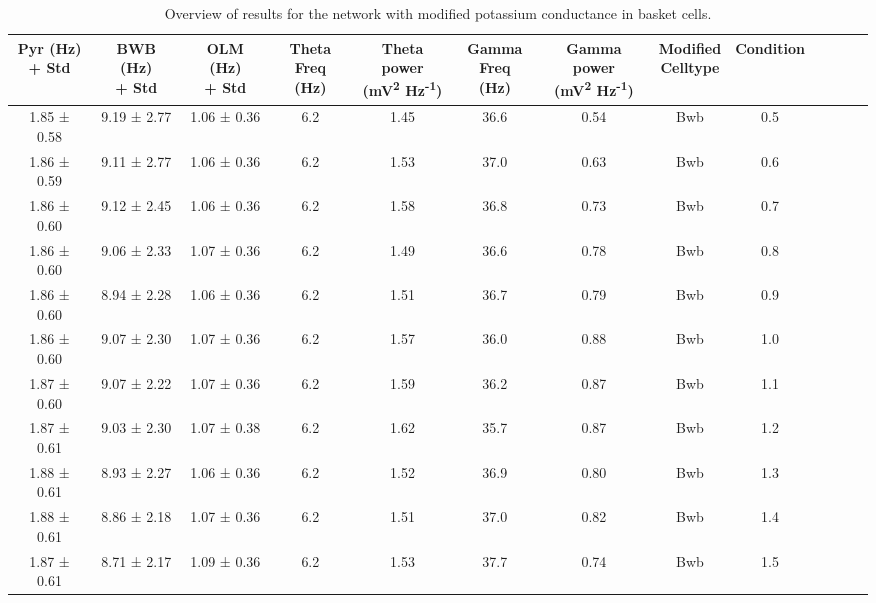 \begin{table}[htbp]
    \caption[Potassium variant: Basket cell]{Overview of results for the network with modified potassium conductance in basket cells.}\label{table:K_variant_bwb}
    \begin{adjustbox}{width=\textwidth}
        \begin{tabular}{ccccccccccccc}
            \hline
            \CellWithForcedBreak{Pyr (Hz)                                                  \\ + Std} & \CellWithForcedBreak{BWB (Hz) \\ + Std} & \CellWithForcedBreak{OLM (Hz) \\ + Std} & \CellWithForcedBreak{Theta \\ Freq (Hz)} & \CellWithForcedBreak{Theta power \\ (mV\textsuperscript{2} Hz\textsuperscript{-1})} & \CellWithForcedBreak{Gamma \\ Freq (Hz)} & \CellWithForcedBreak{Gamma power \\ (mV\textsuperscript{2} Hz\textsuperscript{-1})} & \CellWithForcedBreak{Modified \\ Celltype} & Condition \\
            \hline
            1.85 ± 0.58 & 9.19 ± 2.77 & 1.06 ± 0.36 & 6.2 & 1.45 & 36.6 & 0.54 & Bwb & 0.5 \\
            1.86 ± 0.59 & 9.11 ± 2.77 & 1.06 ± 0.36 & 6.2 & 1.53 & 37.0 & 0.63 & Bwb & 0.6 \\
            1.86 ± 0.60 & 9.12 ± 2.45 & 1.06 ± 0.36 & 6.2 & 1.58 & 36.8 & 0.73 & Bwb & 0.7 \\
            1.86 ± 0.60 & 9.06 ± 2.33 & 1.07 ± 0.36 & 6.2 & 1.49 & 36.6 & 0.78 & Bwb & 0.8 \\
            1.86 ± 0.60 & 8.94 ± 2.28 & 1.06 ± 0.36 & 6.2 & 1.51 & 36.7 & 0.79 & Bwb & 0.9 \\
            1.86 ± 0.60 & 9.07 ± 2.30 & 1.07 ± 0.36 & 6.2 & 1.57 & 36.0 & 0.88 & Bwb & 1.0 \\
            1.87 ± 0.60 & 9.07 ± 2.22 & 1.07 ± 0.36 & 6.2 & 1.59 & 36.2 & 0.87 & Bwb & 1.1 \\
            1.87 ± 0.61 & 9.03 ± 2.30 & 1.07 ± 0.38 & 6.2 & 1.62 & 35.7 & 0.87 & Bwb & 1.2 \\
            1.88 ± 0.61 & 8.93 ± 2.27 & 1.06 ± 0.36 & 6.2 & 1.52 & 36.9 & 0.80 & Bwb & 1.3 \\
            1.88 ± 0.61 & 8.86 ± 2.18 & 1.07 ± 0.36 & 6.2 & 1.51 & 37.0 & 0.82 & Bwb & 1.4 \\
            1.87 ± 0.61 & 8.71 ± 2.17 & 1.09 ± 0.36 & 6.2 & 1.53 & 37.7 & 0.74 & Bwb & 1.5 \\
            \hline
        \end{tabular}
    \end{adjustbox}
\end{table}
